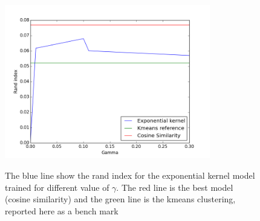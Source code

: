 \documentclass[]{article}
\begin{document}
	\begin{figure}[h]
	\centering
	\includegraphics[width=0.8\textwidth]{Figures_Mik/results.png} 
	\label{fig:best}
	\caption{The blue line show the rand index for the  exponential kernel model trained for different value of $\gamma$. The red line is the best model (cosine similarity) and the green line is the kmeans clustering, reported here as a bench mark } 
\end{figure}



	
	
\end{document}
